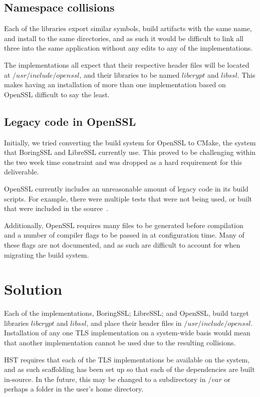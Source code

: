 \documentclass{acm_proc_article-sp}
\begin{document}
\subsection{Namespace collisions}

Each of the libraries export similar symbols,
build artifacts with the same name, and install to the same directories, and as
such it would be difficult to link all three into the same application without
any edits to any of the implementations.

The implementations all expect that their respective header files will be
located at $/usr/include/openssl$, and their libraries to be named $libcrypt$
and $libssl$. This makes having an installation of more than one implementation
based on OpenSSL difficult to say the least.

\subsection{Legacy code in OpenSSL}

Initially, we tried converting the build system
for OpenSSL to CMake, the system that BoringSSL and LibreSSL currently use. This
proved to be challenging within the two week time constraint and was dropped as
a hard requirement for this deliverable.

OpenSSL currently includes an unreasonable amount of legacy code in its build
scripts. For example, there were multiple tests that were not being used, or
built that were included in the source~\cite{issue}.

Additionally, OpenSSL requires many files to be generated before compilation and
a number of compiler flags to be passed in at configuration time. Many of these
flags are not documented, and as such are difficult to account for when
migrating the build system.

\section{Solution}

Each of the implementations, BoringSSL; LibreSSL; and OpenSSL, build target
libraries $libcrypt$ and $libssl$, and place their header files in
$/usr/include/openssl$. Installation of any one TLS implementation on a
system-wide basis would mean that another implementation cannot be used due to
the resulting collisions.

HST requires that each of the TLS implementations be available on the system,
and as such scaffolding has been set up so that each of the dependencies are
built in-source. In the future, this may be changed to a subdirectory in $/var$
or perhaps a folder in the user's home directory.
\end{document}
